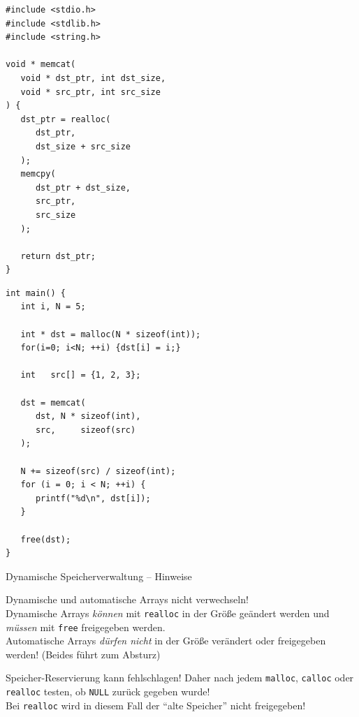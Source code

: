 \begin{frame}[fragile]
%
%
\begin{codebox}
\begin{verbatim}
#include <stdio.h>
#include <stdlib.h>
#include <string.h>

void * memcat(
   void * dst_ptr, int dst_size,
   void * src_ptr, int src_size
) {
   dst_ptr = realloc(
      dst_ptr, 
      dst_size + src_size
   );
   memcpy(
      dst_ptr + dst_size, 
      src_ptr, 
      src_size
   );

   return dst_ptr;
}
\end{verbatim}
\end{codebox}
%
\begin{codebox}[...Fortsetzung]
\begin{verbatim}
int main() {
   int i, N = 5;

   int * dst = malloc(N * sizeof(int));
   for(i=0; i<N; ++i) {dst[i] = i;}
   
   int   src[] = {1, 2, 3};

   dst = memcat(
      dst, N * sizeof(int), 
      src,     sizeof(src)
   );

   N += sizeof(src) / sizeof(int);
   for (i = 0; i < N; ++i) {
      printf("%d\n", dst[i]);
   }

   free(dst);
}
\end{verbatim}
\end{codebox}
%
\end{frame}


\begin{frame}{Dynamische Speicherverwaltung -- Hinweise}
%
%
\begin{warnbox}
Dynamische und automatische Arrays nicht verwechseln!\\
Dynamische Arrays \emph{können} mit \texttt{realloc} in der Größe geändert werden und \emph{müssen} mit \texttt{free} freigegeben werden.\\
Automatische Arrays \emph{dürfen nicht} in der Größe verändert oder freigegeben werden! (Beides führt zum Absturz)
\end{warnbox}
%
\begin{hintbox}
Speicher-Reservierung kann fehlschlagen! Daher nach jedem \texttt{malloc}, \texttt{calloc} oder \texttt{realloc} testen, ob \texttt{NULL} zurück gegeben wurde!\\
Bei \texttt{realloc} wird in diesem Fall der \enquote{alte Speicher} nicht freigegeben!
\end{hintbox}
%
\end{frame}

